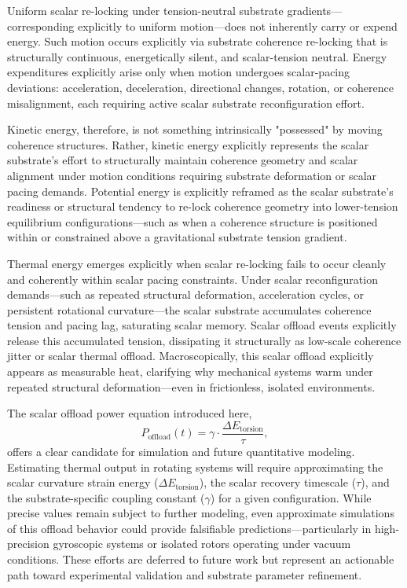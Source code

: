 \documentclass[preprints,article,submit,pdftex,moreauthors]{Definitions/mdpi}
\begin{document}
Uniform scalar re-locking under tension-neutral substrate gradients—corresponding explicitly to uniform motion—does not inherently carry or expend energy. Such motion occurs explicitly via substrate coherence re-locking that is structurally continuous, energetically silent, and scalar-tension neutral. Energy expenditures explicitly arise only when motion undergoes scalar-pacing deviations: acceleration, deceleration, directional changes, rotation, or coherence misalignment, each requiring active scalar substrate reconfiguration effort.

Kinetic energy, therefore, is not something intrinsically "possessed" by moving coherence structures. Rather, kinetic energy explicitly represents the scalar substrate's effort to structurally maintain coherence geometry and scalar alignment under motion conditions requiring substrate deformation or scalar pacing demands. Potential energy is explicitly reframed as the scalar substrate's readiness or structural tendency to re-lock coherence geometry into lower-tension equilibrium configurations—such as when a coherence structure is positioned within or constrained above a gravitational substrate tension gradient.

Thermal energy emerges explicitly when scalar re-locking fails to occur cleanly and coherently within scalar pacing constraints. Under scalar reconfiguration demands—such as repeated structural deformation, acceleration cycles, or persistent rotational curvature—the scalar substrate accumulates coherence tension and pacing lag, saturating scalar memory. Scalar offload events explicitly release this accumulated tension, dissipating it structurally as low-scale coherence jitter or scalar thermal offload. Macroscopically, this scalar offload explicitly appears as measurable heat, clarifying why mechanical systems warm under repeated structural deformation—even in frictionless, isolated environments.

The scalar offload power equation introduced here,
\[
P_{\text{offload}}(t) = \gamma \cdot \frac{\Delta E_{\text{torsion}}}{\tau},
\]
offers a clear candidate for simulation and future quantitative modeling. Estimating thermal output in rotating systems will require approximating the scalar curvature strain energy (\( \Delta E_{\text{torsion}} \)), the scalar recovery timescale (\( \tau \)), and the substrate-specific coupling constant (\( \gamma \)) for a given configuration. While precise values remain subject to further modeling, even approximate simulations of this offload behavior could provide falsifiable predictions—particularly in high-precision gyroscopic systems or isolated rotors operating under vacuum conditions. These efforts are deferred to future work but represent an actionable path toward experimental validation and substrate parameter refinement.
\end{document}
